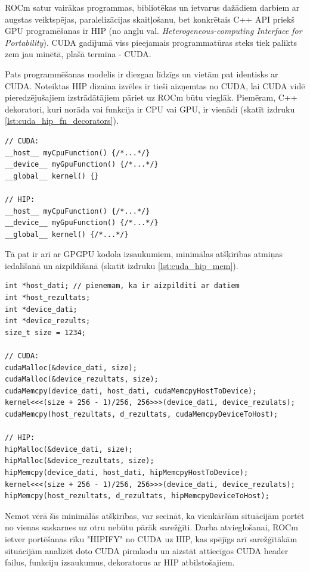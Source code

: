 ROCm satur vairākas programmas, bibliotēkas un ietvarus dažādiem darbiem ar
augstas veiktspējas, paralelizācijas skaitļošanu, bet konkrētais C++ API priekš
GPU programēšanas ir HIP (no angļu val. \textit{Heterogeneous-computing
Interface for Portability}).\cite{HIP_docs} CUDA gadījumā viss pieejamais
programmatūras steks tiek palikts zem jau minētā, plašā termina - CUDA.

Pats programmēšanas modelis ir diezgan līdzīgs un vietām pat identisks ar
CUDA. Noteiktas HIP dizaina izvēles ir tieši aizņemtas no CUDA, lai CUDA vidē
pieredzējušajiem izstrādātājiem pāriet uz ROCm būtu vieglāk. Piemēram, C++
dekoratori, kuri norāda vai funkcija ir CPU vai GPU, ir vienādi (skatīt 
izdruku \ref{lst:cuda_hip_fn_decorators}).

\begin{lstlisting}[caption={CUDA un HIP funkciju definīciju salīdzinājums},
  label=lst:cuda_hip_fn_decorators,
  captionpos=b
]
// CUDA:
__host__ myCpuFunction() {/*...*/}
__device__ myGpuFunction() {/*...*/}
__global__ kernel() {}

// HIP:
__host__ myCpuFunction() {/*...*/}
__device__ myGpuFunction() {/*...*/}
__global__ kernel() {/*...*/}
\end{lstlisting}

Tā pat ir arī ar GPGPU kodola izsaukumiem, minimālas atšķirības atmiņas
iedalīšanā un aizpildīšanā (skatīt izdruku \ref{lst:cuda_hip_mem}).

\begin{lstlisting}[caption={CUDA un HIP kodola darbināšanas, atmiņas API
    izsaukumu salīdzinājums},
  label=lst:cuda_hip_mem,
  captionpos=b
]
int *host_dati; // pienemam, ka ir aizpilditi ar datiem
int *host_rezultats;
int *device_dati;
int *device_rezults;
size_t size = 1234;

// CUDA:
cudaMalloc(&device_dati, size);
cudaMalloc(&device_rezultats, size);
cudaMemcpy(device_dati, host_dati, cudaMemcpyHostToDevice);
kernel<<<(size + 256 - 1)/256, 256>>>(device_dati, device_rezulats);
cudaMemcpy(host_rezultats, d_rezultats, cudaMemcpyDeviceToHost);

// HIP:
hipMalloc(&device_dati, size);
hipMalloc(&device_rezultats, size);
hipMemcpy(device_dati, host_dati, hipMemcpyHostToDevice);
kernel<<<(size + 256 - 1)/256, 256>>>(device_dati, device_rezulats);
hipMemcpy(host_rezultats, d_rezultats, hipMemcpyDeviceToHost);
\end{lstlisting}

Ņemot vērā šīs minimālās atšķirības, var secināt, ka vienkāršām situācijām portēt no vienas saskarnes
uz otru nebūtu pārāk sarežģīti. Darba atvieglošanai, ROCm ietver portēšanas rīku "HIPIFY" 
\cite{HIPIFY_github} no CUDA uz HIP,
kas spējīgs arī sarežģītākām situācijām analizēt doto CUDA pirmkodu un aizstāt attiecīgos CUDA
header failus, funkciju izsaukumus, dekoratorus ar HIP atbilstošajiem.

